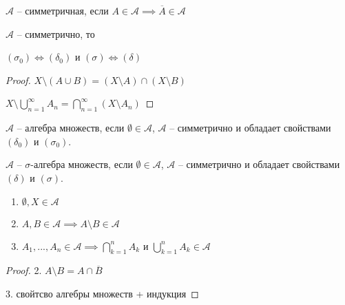 \begin{definition}\thmslashn

	$\mathcal{A}$ -- симметричная, если $A \in \mathcal{A} \implies \overline{A} \in \mathcal{A}$

\end{definition}


\begin{statement}\thmslashn
	
	$\mathcal{A}$ -- симметрично, то
	
	$(\sigma_0) \iff (\delta_0)$ и $(\sigma) \iff (\delta)$
\end{statement}

\begin{proof}\thmslashn
	
	$X\setminus (A\cup B) = (X\setminus A) \cap (X\setminus B)$
	
	
	$X\setminus \bigcup\limits_{n=1}^{\infty}A_n = \bigcap\limits_{n = 1}^{\infty} (X\setminus A_n)$
\end{proof}

\begin{definition}\thmslashn
	
	$\mathcal{A}$ -- алгебра множеств, если  $\emptyset \in \mathcal{A}$, $\mathcal{A}$ -- симметрично и обладает свойствами $(\delta_0)$ и $(\sigma_0)$.
	
	$\mathcal{A}$ -- $\sigma$-алгебра множеств, если  $\emptyset \in \mathcal{A}$, $\mathcal{A}$ -- симметрично и обладает свойствами $(\delta)$ и $(\sigma)$.
	
\end{definition}


\begin{properties}\thmslashn
	
	\begin{enumerate}
		
		\item $\emptyset,X \in \mathcal{A}$
		
		\item $A,B \in \mathcal{A} \implies A\setminus B \in \mathcal{A}$
		
		\item $A_1,...,A_n \in \mathcal{A} \implies \bigcap\limits_{k=1}^n A_k $ и $\bigcup\limits_{k=1}^n A_k \in \mathcal{A}$
		
		
	\end{enumerate}
\end{properties}


\begin{proof}\thmslashn
	
	2. $A\setminus B = A \cap \overline{B}$
	
	3. свойтсво алгебры множеств + индукция
\end{proof}

